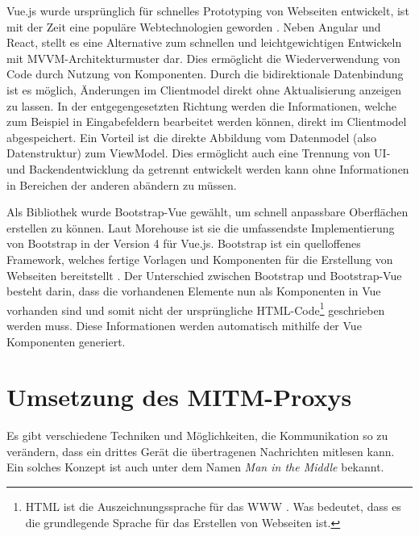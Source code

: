     Vue.js wurde ursprünglich für schnelles Prototyping von Webseiten entwickelt, ist mit der Zeit eine populäre Webtechnologien geworden \cite{you2018vue,stack_overflow_2019}. Neben Angular und React, stellt es eine Alternative zum schnellen und leichtgewichtigen Entwickeln mit \ac{MVVM}-Architekturmuster dar. Dies ermöglicht die Wiederverwendung von Code durch Nutzung von Komponenten. Durch die bidirektionale Datenbindung ist es möglich, Änderungen im Clientmodel direkt ohne Aktualisierung anzeigen zu lassen. In der entgegengesetzten Richtung werden die Informationen, welche zum Beispiel in Eingabefeldern bearbeitet werden können, direkt im Clientmodel abgespeichert. Ein Vorteil ist die direkte Abbildung vom Datenmodel (also Datenstruktur) zum ViewModel. Dies ermöglicht auch eine Trennung von UI- und Backendentwicklung da getrennt entwickelt werden kann ohne Informationen in Bereichen der anderen abändern zu müssen. \cite{filipova_2016}
    
    Als Bibliothek wurde Bootstrap-Vue gewählt, um schnell anpassbare Oberflächen erstellen zu können.
    Laut Morehouse \cite{morehouse_2019} ist sie die umfassendste Implementierung von Bootstrap in der Version 4 für Vue.js.
    Bootstrap ist ein quelloffenes Framework, welches fertige Vorlagen und Komponenten für die Erstellung von Webseiten bereitstellt \cite{otto_thornton_2019}. Der Unterschied zwischen Bootstrap und Bootstrap-Vue besteht darin, dass die vorhandenen Elemente nun als Komponenten in Vue vorhanden sind und somit nicht der ursprüngliche \ac{HTML}-Code\footnote{\ac{HTML} ist die Auszeichnungssprache für das \ac{WWW} \cite{w3c_2017}. Was bedeutet, dass es die grundlegende Sprache für das Erstellen von Webseiten ist.} geschrieben werden muss. Diese Informationen werden automatisch mithilfe der Vue Komponenten generiert.
        
\section{Umsetzung des MITM-Proxys}
    Es gibt verschiedene Techniken und Möglichkeiten, die Kommunikation so zu verändern, dass ein drittes Gerät die übertragenen Nachrichten mitlesen kann. Ein solches Konzept ist auch unter dem Namen \emph{Man in the Middle} bekannt.
    

